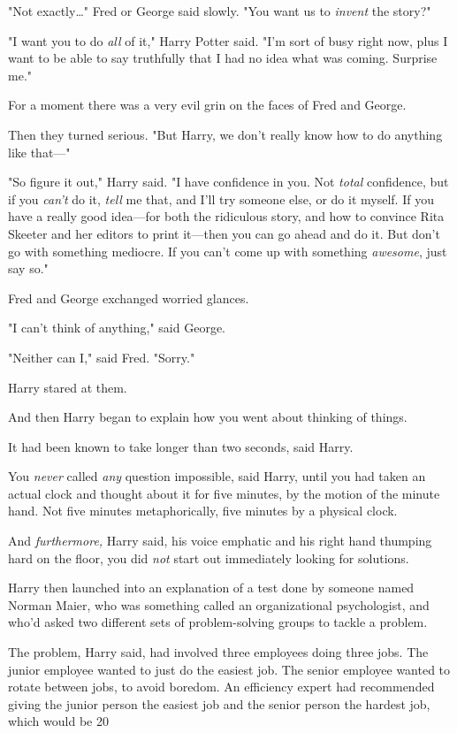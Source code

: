 "Not exactly{\ldots}" Fred or George said slowly. "You want us to \emph{invent} 
the story?"

"I want you to do \emph{all} of it," Harry Potter said. "I'm sort of busy right 
now, plus I want to be able to say truthfully that I had no idea what was 
coming. Surprise me."

For a moment there was a very evil grin on the faces of Fred and George.

Then they turned serious. "But Harry, we don't really know how to do anything 
like that---"

"So figure it out," Harry said. "I have confidence in you. Not \emph{total} 
confidence, but if you \emph{can't} do it, \emph{tell} me that, and I'll try 
someone else, or do it myself. If you have a really good idea---for both the 
ridiculous story, and how to convince Rita Skeeter and her editors to print 
it---then you can go ahead and do it. But don't go with something mediocre. If 
you can't come up with something \emph{awesome}, just say so."

Fred and George exchanged worried glances.

"I can't think of anything," said George.

"Neither can I," said Fred. "Sorry."

Harry stared at them.

And then Harry began to explain how you went about thinking of things.

It had been known to take longer than two seconds, said Harry.

You \emph{never} called \emph{any} question impossible, said Harry, until you 
had taken an actual clock and thought about it for five minutes, by the motion 
of the minute hand. Not five minutes metaphorically, five minutes by a physical 
clock.

And \emph{furthermore,} Harry said, his voice emphatic and his right hand 
thumping hard on the floor, you did \emph{not} start out immediately looking 
for solutions.

Harry then launched into an explanation of a test done by someone named Norman 
Maier, who was something called an organizational psychologist, and who'd asked 
two different sets of problem-solving groups to tackle a problem.

The problem, Harry said, had involved three employees doing three jobs. The 
junior employee wanted to just do the easiest job. The senior employee wanted 
to rotate between jobs, to avoid boredom. An efficiency expert had recommended 
giving the junior person the easiest job and the senior person the hardest job, 
which would be 20%

